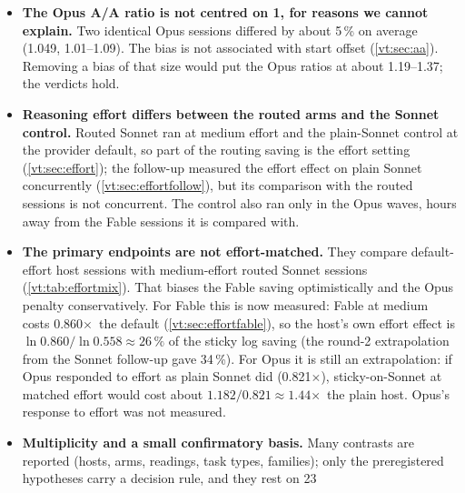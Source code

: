 \documentclass[11pt,letterpaper]{article}
\newcommand{\X}{\ensuremath{\times}}
\newcommand{\AAOpus}{1.049}
\newcommand{\AAOpusCI}{1.01--1.09}
\newcommand{\AAOpusPct}{5}
\newcommand{\ConfirmAfterMin}{56}
\newcommand{\EcRatio}{0.821}
\newcommand{\EfRatio}{0.860}
\newcommand{\EfShare}{26}
\newcommand{\NDeviations}{10}
\newcommand{\NTest}{23}
\newcommand{\OpusAdjHigh}{1.37}
\newcommand{\OpusAdjLow}{1.19}
\newcommand{\RgEffShareFable}{34}
\newcommand{\RgFabStickyPair}{0.558}
\newcommand{\RgOpusMatched}{1.44}
\newcommand{\RvEffVsAnchorOpus}{1.182}
\begin{document}
\begin{itemize}
    split and decision rule; the confirmatory script that fixed resamples, seed, the quality filter and the
    verdict rule was committed about \ConfirmAfterMin\ minutes after the campaign finished, when exploratory
    summaries over all scenarios existed. The analysis also resolved \NDeviations\ ambiguities or mismatches
    in the preregistration (\cref{vt:sec:deviations}); only the two non-inferiority readings and the bootstrap
    seed were varied in sensitivity checks.
  \item \textbf{The Opus A/A ratio is not centred on 1, for reasons we cannot explain.} Two identical Opus
    sessions differed by about \AAOpusPct\,\% on average (\AAOpus, \AAOpusCI). The bias is not associated with
    start offset (\cref{vt:sec:aa}). Removing a bias of that size would put the Opus ratios at about
    \OpusAdjLow--\OpusAdjHigh; the verdicts hold.
  \item \textbf{Reasoning effort differs between the routed arms and the Sonnet control.} Routed Sonnet ran at
    medium effort and the plain-Sonnet control at the provider default, so part of the routing saving is the
    effort setting (\cref{vt:sec:effort}); the follow-up measured the effort effect on plain Sonnet concurrently
    (\cref{vt:sec:effortfollow}), but its comparison with the routed sessions is not concurrent. The control also ran only in the Opus waves, hours away from the Fable
    sessions it is compared with.
  \item \textbf{The primary endpoints are not effort-matched.} They compare default-effort host sessions with
    medium-effort routed Sonnet sessions (\cref{vt:tab:effortmix}). That biases the Fable saving optimistically and the Opus
    penalty conservatively. For Fable this is now measured: Fable at medium costs \EfRatio\X\ the default
    (\cref{vt:sec:effortfable}), so the host's own effort effect is $\ln \EfRatio / \ln \RgFabStickyPair \approx
    \EfShare\,\%$ of the sticky log saving (the round-2 extrapolation from the Sonnet follow-up gave
    \RgEffShareFable\,\%). For Opus it is still an extrapolation: if Opus responded to effort as plain Sonnet did
    (\EcRatio\X), sticky-on-Sonnet at matched effort would cost about
    $\RvEffVsAnchorOpus / \EcRatio \approx \RgOpusMatched$\X\ the plain host. Opus's response to effort was not
    measured.
  \item \textbf{Multiplicity and a small confirmatory basis.} Many contrasts are reported (hosts, arms, readings,
    task types, families); only the preregistered hypotheses carry a decision rule, and they rest on \NTest\

\end{itemize}
\end{document}
